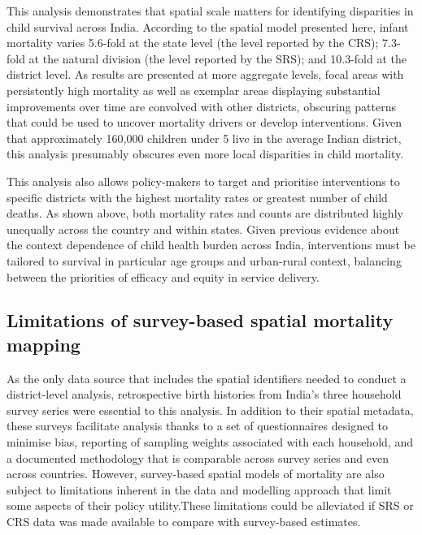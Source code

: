 \documentclass[
]{report}
\begin{document}
This analysis demonstrates that spatial scale matters for identifying disparities in child survival across India. According to the spatial model presented here, infant mortality varies 5.6-fold at the state level (the level reported by the CRS); 7.3-fold at the natural division (the level reported by the SRS); and 10.3-fold at the district level. As results are presented at more aggregate levels, focal areas with persistently high mortality as well as exemplar areas displaying substantial improvements over time are convolved with other districts, obscuring patterns that could be used to uncover mortality drivers or develop interventions. Given that approximately 160,000 children under 5 live in the average Indian district,\autocite{Tatem2017} this analysis presumably obscures even more local disparities in child mortality.

This analysis also allows policy-makers to target and prioritise interventions to specific districts with the highest mortality rates or greatest number of child deaths. As shown above, both mortality rates and counts are distributed highly unequally across the country and within states. Given previous evidence about the context dependence of child health burden across India, interventions must be tailored to survival in particular age groups and urban-rural context, balancing between the priorities of efficacy and equity in service delivery.\autocite{Dandona2017,IND_MOHFW2017a}

\hypertarget{limitations-of-survey-based-spatial-mortality-mapping}{%
\subsection{Limitations of survey-based spatial mortality mapping}\label{limitations-of-survey-based-spatial-mortality-mapping}}

As the only data source that includes the spatial identifiers needed to conduct a district-level analysis, retrospective birth histories from India's three household survey series were essential to this analysis. In addition to their spatial metadata, these surveys facilitate analysis thanks to a set of questionnaires designed to minimise bias, reporting of sampling weights associated with each household, and a documented methodology that is comparable across survey series and even across countries.\autocite{Dandona2016,Corsi2012} However, survey-based spatial models of mortality are also subject to limitations inherent in the data and modelling approach that limit some aspects of their policy utility.These limitations could be alleviated if SRS or CRS data was made available to compare with survey-based estimates.
\end{document}
